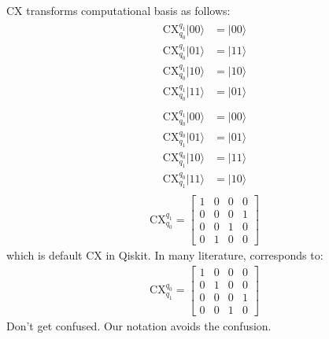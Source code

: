 \documentclass[letterpaper,10pt,english]{jupyterBook}
\begin{document}
\sphinxAtStartPar
CX transforms computational basis as follows:
\begin{equation*}
\begin{split}
\begin{align}
\text{CX}_{q_0}^{q_1} \lvert 00\rangle &= \lvert 00\rangle \\
\text{CX}_{q_0}^{q_1} \lvert 01\rangle &= \lvert 11\rangle \\
\text{CX}_{q_0}^{q_1} \lvert 10\rangle &= \lvert 10\rangle \\
\text{CX}_{q_0}^{q_1} \lvert 11\rangle &= \lvert 01\rangle
\end{align}
\end{split}
\end{equation*}\begin{equation*}
\begin{split}
\begin{align}
\text{CX}_{q_0}^{q_1} \lvert 00\rangle &= \lvert 00\rangle \\
\text{CX}_{q_1}^{q_0} \lvert 01\rangle &= \lvert 01\rangle \\
\text{CX}_{q_1}^{q_0} \lvert 10\rangle &= \lvert 11\rangle \\
\text{CX}_{q_1}^{q_0} \lvert 11\rangle &= \lvert 10\rangle
\end{align}
\end{split}
\end{equation*}
\sphinxAtStartPar
{}
\begin{equation*}
\begin{split}
\text{CX}_{q_0}^{q_1} = \begin{bmatrix} 1&0&0&0\\0&0&0&1\\0&0&1&0\\0&1&0&0\end{bmatrix}
\end{split}
\end{equation*}
\sphinxAtStartPar
which is default CX in Qiskit.  In many literature,  corresponds to:
\begin{equation*}
\begin{split}
\text{CX}_{q_1}^{q_0} = \begin{bmatrix} 1&0&0&0\\0&1&0&0\\0&0&0&1\\0&0&1&0\end{bmatrix}
\end{split}
\end{equation*}
\sphinxAtStartPar
Don’t get confused. Our notation avoids the confusion.
\end{document}
